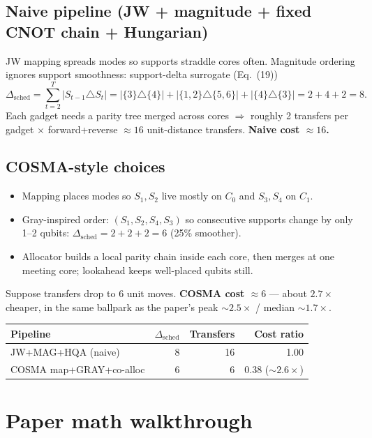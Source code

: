 \documentclass[11pt]{article}
\begin{document}
\subsection*{Naive pipeline (JW + magnitude + fixed CNOT chain + Hungarian)}
JW mapping spreads modes so supports straddle cores often.
Magnitude ordering ignores support smoothness:
support-delta surrogate (Eq.~(19))
\[
\Delta_{\mathrm{sched}}=\sum_{t=2}^{T}|S_{t-1}\triangle S_t|
= |\{3\}\triangle\{4\}| + |\{1,2\}\triangle\{5,6\}| + |\{4\}\triangle\{3\}|
= 2+4+2=8.
\]
Each gadget needs a parity tree merged across cores $\Rightarrow$ roughly 2 transfers per
gadget $\times$ forward+reverse $\approx 16$ unit-distance transfers.
\textbf{Naive cost $\approx 16$.}

\subsection*{COSMA-style choices}
\begin{itemize}[leftmargin=*,itemsep=2pt]
  \item Mapping places modes so $S_1,S_2$ live mostly on $C_0$ and $S_3,S_4$ on $C_1$.
  \item Gray-inspired order: $(S_1,S_2,S_4,S_3)$ so consecutive supports change by
        only 1--2 qubits: $\Delta_{\mathrm{sched}}=2+2+2=6$ (25\% smoother).
  \item Allocator builds a local parity chain inside each core, then merges at one
        meeting core; lookahead keeps well-placed qubits still.
\end{itemize}
Suppose transfers drop to 6 unit moves.
\textbf{COSMA cost $\approx 6$} --- about $\mathbf{2.7\times}$ cheaper, in the same ballpark as
the paper's peak $\sim\!2.5\times$ / median $\sim\!1.7\times$.

\begin{center}
\begin{tabular}{@{}lrrr@{}}
\toprule
Pipeline & $\Delta_{\mathrm{sched}}$ & Transfers & Cost ratio \\
\midrule
JW+MAG+HQA (naive) & 8 & 16 & 1.00 \\
COSMA map+GRAY+co-alloc & 6 & 6 & $\mathbf{0.38}$ ($\sim\!2.6\times$) \\
\bottomrule
\end{tabular}
\end{center}

\section{Paper math walkthrough}
\end{document}
